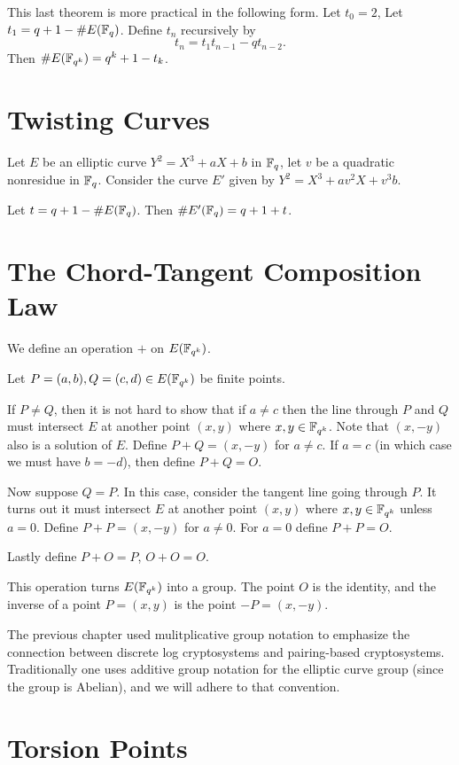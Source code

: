 This last theorem is more practical in the following form. Let $t_0 = 2$,
Let $t_1 = q + 1 - \#E(\mathbb{F}_q)$.
Define $t_n$ recursively by
\[ t_n = t_1 t_{n-1} - q t_{n-2} .\]
Then $\#E(\mathbb{F}_{q^k}) = q^k + 1 - t_k$.

\section {Twisting Curves}

Let $E$ be an elliptic curve $Y^2 = X^3 + a X + b$ in $\mathbb{F}_q$,
let $v$ be a quadratic nonresidue in $\mathbb{F}_q$. Consider the
curve $E'$ given by $Y^2 = X^3 + a v^2 X + v^3 b$.

Let $t = q + 1 - \#E(\mathbb{F}_q)$.
Then $\#E'(\mathbb{F}_q) = q + 1 + t$.


\section {The Chord-Tangent Composition Law}

We define an operation $+$ on $E(\mathbb{F}_{q^k})$.

Let $P = (a,b), Q = (c,d) \in E(\mathbb{F}_{q^k})$ be finite points.

If $P \ne Q$, then it is not hard to show that if $a \ne c$
then the line through $P$ and $Q$ must intersect $E$ at another point
$(x,y)$ where $x, y\in \mathbb{F}_{q^k}$. Note that $(x,-y)$ also is a solution of $E$.
Define $P + Q = (x, -y)$ for $a \ne c$.
If $a = c$ (in which case we must have $b = -d$),
then define $P + Q = O$.

Now suppose $Q = P$. In this case, consider the tangent line going through
$P$. It turns out it must intersect $E$ at another point $(x,y)$ where
$x,y\in\mathbb{F}_{q^k}$ unless $a = 0$. Define $P + P = (x, -y)$ for $a \ne 0$.
For $a = 0$ define $P + P = O$.

Lastly define $P + O = P$, $O + O = O$.

This operation turns $E(\mathbb{F}_{q^k})$ into a group.
The point $O$ is the identity, and the inverse
of a point $P = (x,y)$ is the point $-P = (x,-y)$.

The previous chapter used mulitplicative group notation to emphasize
the connection
between discrete log cryptosystems and pairing-based cryptosystems.
Traditionally one uses additive group notation for the elliptic curve group
(since the group is Abelian), and we will adhere to that convention.

\section {Torsion Points}

